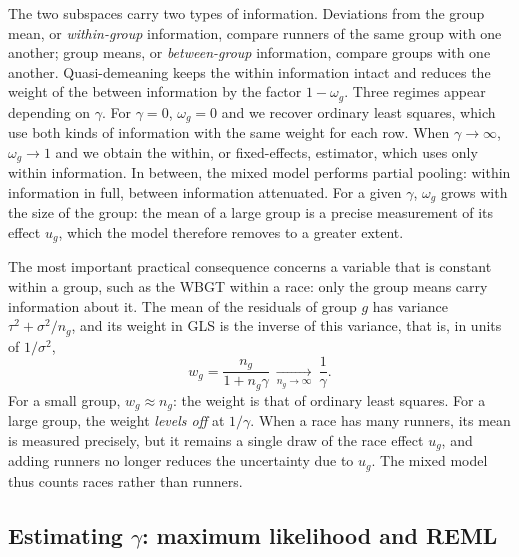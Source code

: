 \documentclass[11pt,a4paper]{article}
\begin{document}
The two subspaces carry two types of information. Deviations from the group mean, or \emph{within-group} information,
compare runners of the same group with one another; group means, or \emph{between-group} information, compare groups
with one another. Quasi-demeaning keeps the within information intact and reduces the weight of the between
information by the factor $1 - \omega_g$. Three regimes appear depending on $\gamma$. For $\gamma = 0$, $\omega_g = 0$
and we recover ordinary least squares, which use both kinds of information with the same weight for each row. When
$\gamma \to \infty$, $\omega_g \to 1$ and we obtain the within, or fixed-effects, estimator, which uses only within
information. In between, the mixed model performs partial pooling: within information in full, between information
attenuated. For a given $\gamma$, $\omega_g$ grows with the size of the group: the mean of a large group is a precise
measurement of its effect $u_g$, which the model therefore removes to a greater extent.

The most important practical consequence concerns a variable that is constant within a group, such as the WBGT within
a race: only the group means carry information about it. The mean of the residuals of group $g$ has variance
$\tau^2 + \sigma^2/n_g$, and its weight in GLS is the inverse of this variance, that is, in units of $1/\sigma^2$,
\begin{equation}\label{eq:group_weight}
w_g = \frac{n_g}{1 + n_g\gamma} \ \xrightarrow[n_g \to \infty]{}\ \frac{1}{\gamma}.
\end{equation}
For a small group, $w_g \approx n_g$: the weight is that of ordinary least squares. For a large group, the weight
\emph{levels off} at $1/\gamma$. When a race has many runners, its mean is measured precisely, but it remains a single
draw of the race effect $u_g$, and adding runners no longer reduces the uncertainty due to $u_g$. The mixed model thus
counts races rather than runners.

\subsection{Estimating \texorpdfstring{$\gamma$}{gamma}: maximum likelihood and REML}\label{sec:reml}
\end{document}
